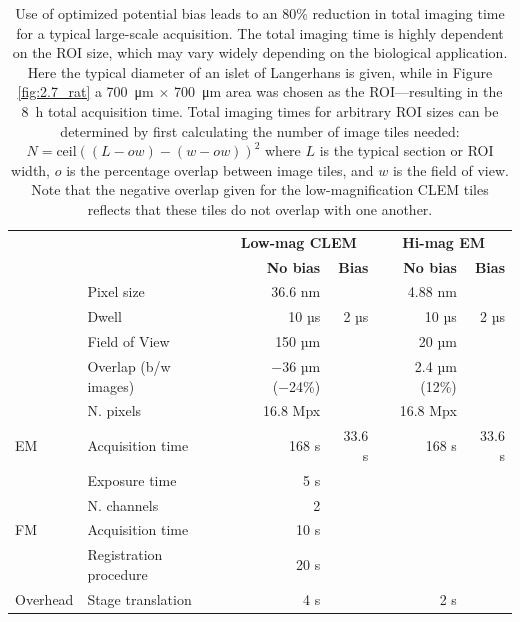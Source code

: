 \begin{table}[!tbh]
    \centering
    \caption{Use of optimized potential bias leads to an 80\% reduction in total imaging time for a typical large-scale acquisition. The total imaging time is highly dependent on the ROI size, which may vary widely depending on the biological application. Here the typical diameter of an islet of Langerhans is given, while in Figure \ref{fig:2.7_rat} a \SI{700}{\micro\meter} $\times$ \SI{700}{\micro\meter} area was chosen as the ROI—resulting in the \SI{8}{\hour} total acquisition time. Total imaging times for arbitrary ROI sizes can be determined by first calculating the number of image tiles needed: $N=\text{ceil}\left((L-ow) - (w-ow)\right)^2$ where $L$ is the typical section or ROI width, $o$ is the percentage overlap between image tiles, and $w$ is the field of view. Note that the negative overlap given for the low-magnification CLEM tiles reflects that these tiles do not overlap with one another.}
    \footnotesize
    \begin{tabular}{@{}p{15mm}p{30mm}rrrr@{}}
    \toprule
    \multicolumn{1}{r}{} & \multicolumn{1}{r}{} & \multicolumn{2}{c}{\textbf{Low-mag CLEM}} & \multicolumn{2}{c}{\textbf{Hi-mag EM}} \\
     \arrayrulecolor{black!30}\cmidrule(l){3-4} \cmidrule(l){5-6}
     &  & \textbf{No bias} & \textbf{Bias} & \textbf{No bias} & \textbf{Bias} \\
     \arrayrulecolor{black!30}\midrule
     & Pixel size & 36.6 nm &  & 4.88 nm &  \\
     & Dwell & 10 µs & 2 µs & 10 µs & 2 µs \\
     & Field of View & 150 µm &  & 20 µm &  \\
     & Overlap (b/w images) & −36 µm (−24\%) &  & 2.4 µm (12\%) &  \\
     & N. pixels & 16.8 Mpx &  & 16.8 Mpx &  \\
    \multirow{-6}{*}{EM} & Acquisition time & 168 s & 33.6 s & 168 s & 33.6 s \\
    \arrayrulecolor{black!30}\midrule
     & Exposure time & 5 s &  &  &  \\
     & N. channels & 2 &  &  &  \\
    \multirow{-3}{*}{FM} & Acquisition time & 10 s &  &  &  \\
    \arrayrulecolor{black!30}\midrule
     & Registration procedure & 20 s &  &  &  \\
    \multirow{-2}{*}{Overhead} & Stage translation & 4 s &  & 2 s &  \\

\end{tabular}
\end{table}
